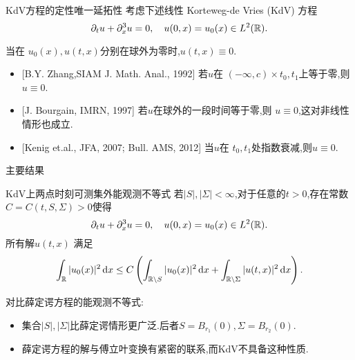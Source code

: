 \begin{frame}[t]{KdV方程的定性唯一延拓性}
  考虑下述线性 Korteweg-de Vries (KdV) 方程
  \begin{equation}\label{kdv}
    \partial_t u +\partial_x^3u=0,\quad u(0,x)=u_0(x)\in L^2(\mathbb{R}).
  \end{equation}

     当在 $u_0(x),u(t,x)$分别在球外为零时,$u(t,x)\equiv 0$.
  \begin{itemize}
    \item {}[B.Y. Zhang,SIAM J. Math. Anal., 1992] 若$u$在 $(-\infty,c)\times {t_0,t_1}$上等于零,则$u\equiv 0$.
    \item {}[J. Bourgain, IMRN, 1997] 若$u$在球外的一段时间等于零,则 $u\equiv 0$,这对非线性情形也成立.
    \item {}[Kenig et.al., JFA, 2007; Bull. AMS, 2012] 当$u$在 $t_0,t_1$处指数衰减,则$u\equiv 0$.
  \end{itemize}
\end{frame}
\begin{frame}[t]{主要结果}
  \begin{alertblock}{KdV上两点时刻可测集外能观测不等式}
    若$|S|,|\Sigma|<\infty$,对于任意的$t>0$,存在常数 $C=C(t,S,\Sigma)>0$使得
    \[ 
    \partial_t u +\partial_x^3u=0,\quad u(0,x)=u_0(x)\in L^2(\mathbb{R}).
    \] 
    所有解$u(t,x)$ 满足
  \begin{equation}\label{obkdv}
    \int_{\mathbb{R}}|u_0(x)|^2\,\mathrm{d}x\le C \left( \int_{\mathbb{R}\setminus S}|u_0(x)|^2\,\mathrm{d}x + \int_{\mathbb{R}\setminus \Sigma} |u(t,x)|^2\,\mathrm{d}x  \right). 
  \end{equation}
  \end{alertblock}
  对比薛定谔方程的能观测不等式:
  \begin{itemize}
    \item 集合$|S|,|\Sigma|$比薛定谔情形更广泛.后者$S=B_{r_1}(0),\Sigma=B_{r_2}(0)$.
    \item 薛定谔方程的解与傅立叶变换有紧密的联系,而KdV不具备这种性质.
  \end{itemize}
\end{frame}


